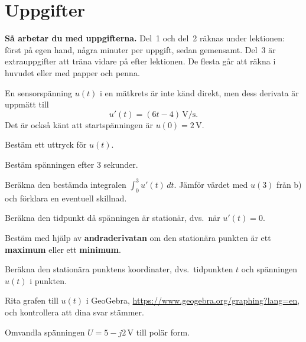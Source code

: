 
\section{Uppgifter}
\label{c15:sec:uppgifter}

\begin{aside}
\textbf{Så arbetar du med uppgifterna.} Del~1 och del~2 räknas under lektionen: först på egen
hand, några minuter per uppgift, sedan gemensamt. Del~3 är extrauppgifter att träna vidare på
efter lektionen. De flesta går att räkna i huvudet eller med papper och penna.

\end{aside}


En sensorspänning $u(t)$ i en mätkrets är inte känd direkt, men dess derivata är uppmätt till
\[
  u'(t) = (6t - 4)\,\text{V/s}.
\]
Det är också känt att startspänningen är $u(0) = 2\,\text{V}$.
\begin{parts}
  \item Bestäm ett uttryck för $u(t)$.
  \item Bestäm spänningen efter $3$ sekunder.
  \item Beräkna den bestämda integralen $\int_0^3 u'(t)\,dt$. Jämför värdet med $u(3)$ från b)
    och förklara en eventuell skillnad.
  \item Beräkna den tidpunkt då spänningen är stationär, dvs.\ när $u'(t) = 0$.
  \item Bestäm med hjälp av \textbf{andraderivatan} om den stationära punkten är ett
    \textbf{maximum} eller ett \textbf{minimum}.
  \item Beräkna den stationära punktens koordinater, dvs.\ tidpunkten $t$ och spänningen $u(t)$ i
    punkten.
  \item Rita grafen till $u(t)$ i GeoGebra, \url{https://www.geogebra.org/graphing?lang=en}, och
    kontrollera att dina svar stämmer.
\end{parts}


Omvandla spänningen $U = 5 - j2\,\text{V}$ till polär form.

